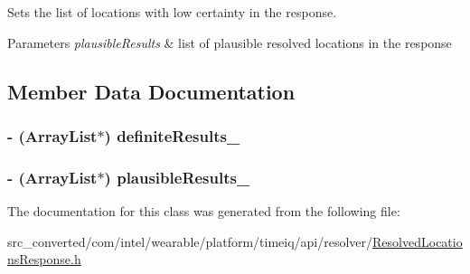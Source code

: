 Sets the list of locations with low certainty in the response. 


\begin{DoxyParams}{Parameters}
{\em plausible\+Results} & list of plausible resolved locations in the response \\
\hline
\end{DoxyParams}


\subsection{Member Data Documentation}
\hypertarget{interface_resolved_locations_response_a20011ed45472ff707a91c9a0fadbd0a6}{}
\subsubsection[{definite\+Results\+\_\+}]{\setlength{\rightskip}{0pt plus 5cm}-\/ (Array\+List$\ast$) definite\+Results\+\_\+}\label{interface_resolved_locations_response_a20011ed45472ff707a91c9a0fadbd0a6}
\hypertarget{interface_resolved_locations_response_a6c6733b496c41ddd7e78d918782ce966}{}
\subsubsection[{plausible\+Results\+\_\+}]{\setlength{\rightskip}{0pt plus 5cm}-\/ (Array\+List$\ast$) plausible\+Results\+\_\+}\label{interface_resolved_locations_response_a6c6733b496c41ddd7e78d918782ce966}


The documentation for this class was generated from the following file\+:\begin{DoxyCompactItemize}
\item 
src\+\_\+converted/com/intel/wearable/platform/timeiq/api/resolver/\hyperlink{_resolved_locations_response_8h}{Resolved\+Locations\+Response.\+h}\end{DoxyCompactItemize}
